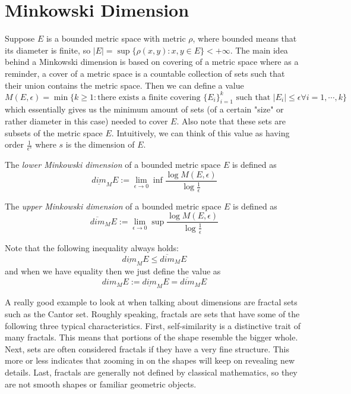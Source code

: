 \documentclass{article}
\begin{document}
\section{Minkowski Dimension}
Suppose $E$ is a bounded metric space with metric $\rho$, where bounded means that its diameter is finite, so $|E|=\sup\{\rho(x,y):x,y\in E\}<+\infty$. The main idea behind a Minkowski dimension is based on covering of a metric space where as a reminder, a cover of a metric space is a countable collection of sets such that their union contains the metric space. Then we can define a value $M(E,\epsilon)=\min\{k\geq 1: \text{there exists a finite covering } \{E_i\}_{i=1}^k \text{ such that } |E_i|\leq \epsilon \forall i=1,\cdots, k\}$ which essentially gives us the minimum amount of sets (of a certain "size" or rather diameter in this case) needed to cover $E$. Also note that these sets are subsets of the metric space $E$. Intuitively, we can think of this value as having order $\frac{1}{\epsilon^s}$ where $s$ is the dimension of $E$.\cite{morters_peres_2010}

\begin{definition}
The \textit{lower Minkowski dimension} of a bounded metric space $E$ is defined as 
$$\underline{dim}_M E:= \lim_{\epsilon\rightarrow 0}\inf{\frac{\log M(E,\epsilon)}{\log{\frac{1}{\epsilon}}}} $$
\end{definition}

\begin{definition}
The \textit{upper Minkowski dimension} of a bounded metric space $E$ is defined as 
$$\overline{dim}_M E:= \lim_{\epsilon\rightarrow 0}\sup{\frac{\log M(E,\epsilon)}{\log{\frac{1}{\epsilon}}}} $$
\end{definition}
Note that the following inequality always holds:
$$\underline{dim}_M E \leq \overline{dim}_M E $$
and when we have equality then we just define the value as 
$$dim_M E:=\underline{dim}_M E =\overline{dim}_M E $$

A really good example to look at when talking about dimensions are fractal sets such as the Cantor set. Roughly speaking, fractals are sets that have some of the following three typical characteristics. First, self-similarity is a distinctive trait of many fractals. This means that portions of the shape resemble the bigger whole. Next, sets are often considered fractals if they have a very fine structure. This more or less indicates
that zooming in on the shapes will keep on revealing new details. Last, fractals are generally not defined by classical mathematics, so they are not smooth shapes or familiar geometric objects.
\end{document}
